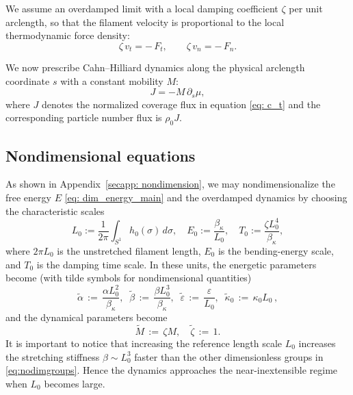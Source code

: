 \documentclass[
aip,
jcp,
reprint, 
floatfix
]{revtex4-1}
\begin{document}
We assume an overdamped limit with a local damping coefficient $\zeta$ per unit arclength, so that the filament
velocity is proportional to the local thermodynamic force density:
\begin{equation}
\zeta\,v_t = -\,F_{t},\qquad
\zeta\,v_n = -\,F_{n}.
\label{eq:overdamped_dim_main}
\end{equation}

We now prescribe Cahn--Hilliard dynamics \cite{10.1063/1.1744102} along the physical arclength
coordinate $s$ with a constant mobility $M$:
\begin{equation}
J = -M\,\partial_s \mu,
\label{eq:flux_dim_main}
\end{equation}
where $J$ denotes the normalized coverage flux in equation \eqref{eq: c_t} and the corresponding particle number flux is $\rho_0 J$.


\subsection{Nondimensional equations} \label{sec: nondim}

As shown in Appendix~\ref{secapp: nondimension}, we may nondimensionalize the free energy $E$
\eqref{eq: dim_energy_main} and the overdamped dynamics by choosing the characteristic scales
\begin{equation}
L_0 := \frac{1}{2\pi}\int_{S^1} h_0(\sigma)\,d\sigma,\quad
E_0 := \frac{\beta_{\kappa}}{L_0},\quad
T_0 := \frac{\zeta L_0^4}{\beta_{\kappa}},
\label{eq:scales_main}
\end{equation}
where $2\pi L_0$ is the unstretched filament length, $E_0$ is the bending-energy scale, and $T_0$ is the damping time scale. In these units, the energetic parameters become (with tilde symbols for nondimensional quantities) 
\begin{equation}
\tilde \alpha \,:=\, \frac{\alpha L_0^2}{\beta_{\kappa}}, \;\;
\tilde \beta \,:=\, \frac{\beta L_0^3}{\beta_{\kappa}}, \;\;
\tilde \varepsilon \,:=\, \frac{\varepsilon}{L_0}, \;\;
\tilde \kappa_0 \,:=\, \kappa_{0} L_0 \,, \label{eq:nodimgroups}
\end{equation}
and the dynamical parameters become
\begin{equation}
    \tilde M \,:=\, \zeta M, \quad
    \tilde \zeta \,:=\, 1.
\end{equation}
It is important to notice that increasing the reference length scale $L_0$ increases the stretching stiffness $\beta \sim L_0^3$ faster than the other dimensionless groups in \eqref{eq:nodimgroups}. Hence the dynamics approaches the near-inextensible regime when  $L_0 $ becomes large. 
\end{document}
